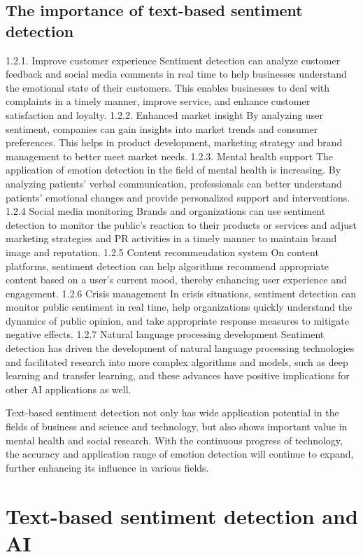 \documentclass[journal]{IEEEtran}
\begin{document}
\subsection{The importance of text-based sentiment detection}
1.2.1.	Improve customer experience 
Sentiment detection can analyze customer feedback and social media comments in real time to help businesses understand the emotional state of their customers. This enables businesses to deal with complaints in a timely manner, improve service, and enhance customer satisfaction and loyalty. 
1.2.2.	Enhanced market insight
By analyzing user sentiment, companies can gain insights into market trends and consumer preferences. This helps in product development, marketing strategy and brand management to better meet market needs. 
1.2.3.	Mental health support 
The application of emotion detection in the field of mental health is increasing. By analyzing patients' verbal communication, professionals can better understand patients' emotional changes and provide personalized support and interventions.
1.2.4	Social media monitoring
Brands and organizations can use sentiment detection to monitor the public's reaction to their products or services and adjust marketing strategies and PR activities in a timely manner to maintain brand image and reputation.
1.2.5	Content recommendation system
On content platforms, sentiment detection can help algorithms recommend appropriate content based on a user's current mood, thereby enhancing user experience and engagement.
1.2.6	Crisis management
In crisis situations, sentiment detection can monitor public sentiment in real time, help organizations quickly understand the dynamics of public opinion, and take appropriate response measures to mitigate negative effects.
1.2.7	Natural language processing development
Sentiment detection has driven the development of natural language processing technologies and facilitated research into more complex algorithms and models, such as deep learning and transfer learning, and these advances have positive implications for other AI applications as well.

Text-based sentiment detection not only has wide application potential in the fields of business and science and technology, but also shows important value in mental health and social research. With the continuous progress of technology, the accuracy and application range of emotion detection will continue to expand, further enhancing its influence in various fields.
\section{Text-based sentiment detection and AI}
\end{document}
